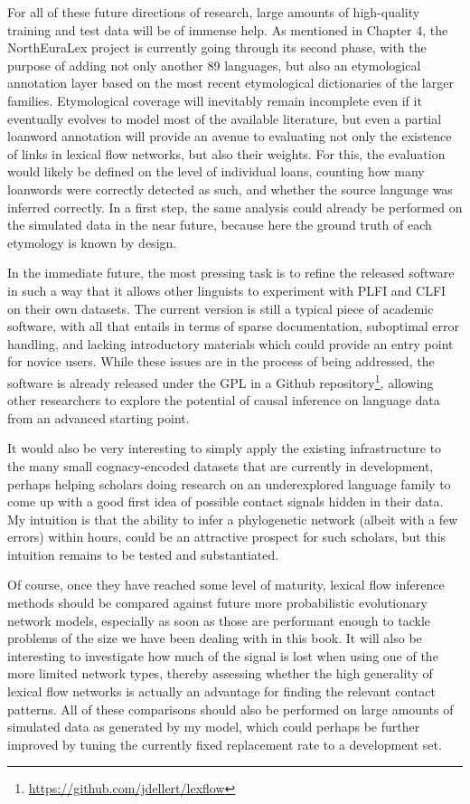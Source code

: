 For all of these future directions of research, large amounts of high-quality training and test data will be of immense help. As mentioned in Chapter 4, the NorthEuraLex project is currently going through its second phase, with the purpose of adding not only another 89 languages, but also an etymological annotation layer based on the most recent etymological dictionaries of the larger families. Etymological coverage will inevitably remain incomplete even if it eventually evolves to model most of the available literature, but even a partial loanword annotation will provide an avenue to evaluating not only the existence of links in lexical flow networks, but also their weights. For this, the evaluation would likely be defined on the level of individual loans, counting how many loanwords were correctly detected as such, and whether the source language was inferred correctly. In a first step, the same analysis could already be performed on the simulated data in the near future, because here the ground truth of 
each etymology is known by design.

In the immediate future, the most pressing task is to refine the released software in such a way that it allows other linguists to experiment with PLFI and CLFI on their own datasets. The current version is still a typical piece of academic software, with all that entails in terms of sparse documentation, suboptimal error handling, and lacking introductory materials which could provide an entry point for novice users. While these issues are in the process of being addressed, the software is already released under the GPL in a Github repository\footnote{\url{https://github.com/jdellert/lexflow}}, allowing other researchers to explore the potential of causal inference on language data from an advanced starting point.

It would also be very interesting to simply apply the existing infrastructure to the many small cognacy-encoded datasets that are currently in development, perhaps helping scholars doing research on an underexplored language family to come up with a good first idea of possible contact signals hidden in their data. My intuition is that the ability to infer a phylogenetic network (albeit with a few errors) within hours, could be an attractive prospect for such scholars, but this intuition remains to be tested and substantiated.

Of course, once they have reached some level of maturity, lexical flow inference methods should be compared against future more probabilistic evolutionary network models, especially as soon as those are performant enough to tackle problems of the size we have been dealing with in this book. It will also be interesting to investigate how much of the signal is lost when using one of the more limited network types, thereby assessing whether the high generality of lexical flow networks is actually an advantage for finding the relevant contact patterns. All of these comparisons should also be performed on large amounts of simulated data as generated by my model, which could perhaps be further improved by tuning the currently fixed replacement rate to a development set.

